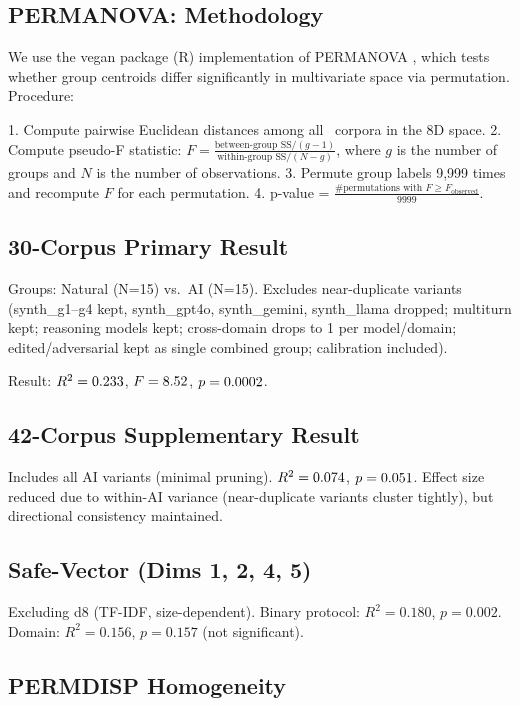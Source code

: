\documentclass[11pt]{article}
\begin{document}
\subsection{PERMANOVA: Methodology}

We use the vegan package (R) implementation of PERMANOVA \citep{anderson2001permanova}, which tests whether group centroids differ significantly in multivariate space via permutation. Procedure:

1. Compute pairwise Euclidean distances among all \nCorpora\ corpora in the 8D space.
2. Compute pseudo-F statistic: $F = \frac{\text{between-group SS} / (g-1)}{\text{within-group SS} / (N - g)}$, where $g$ is the number of groups and $N$ is the number of observations.
3. Permute group labels 9,999 times and recompute $F$ for each permutation.
4. p-value = $\frac{\text{\# permutations with } F \geq F_{\text{observed}}}{9999}$.

\subsection{30-Corpus Primary Result}

Groups: Natural (N=15) vs.\ AI (N=15). Excludes near-duplicate variants (synth\_g1--g4 kept, synth\_gpt4o, synth\_gemini, synth\_llama dropped; multiturn kept; reasoning models kept; cross-domain drops to 1 per model/domain; edited/adversarial kept as single combined group; calibration included).

Result: $R^2 = 0.233$, $F = 8.52$, $p = 0.0002$.

\subsection{42-Corpus Supplementary Result}

Includes all AI variants (minimal pruning). $R^2 = 0.074$, $p = 0.051$. Effect size reduced due to within-AI variance (near-duplicate variants cluster tightly), but directional consistency maintained.

\subsection{Safe-Vector (Dims 1, 2, 4, 5)}

Excluding d8 (TF-IDF, size-dependent). Binary protocol: $R^2 = 0.180$, $p = 0.002$. Domain: $R^2 = 0.156$, $p = 0.157$ (not significant).

\subsection{PERMDISP Homogeneity}
\end{document}
